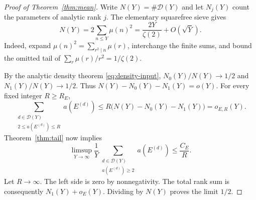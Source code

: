 \begin{proof}[Proof of Theorem~\ref{thm:mean}]
Write \(N(Y)=\#\mathcal D(Y)\) and let \(N_j(Y)\) count the parameters
of analytic rank \(j\).
The elementary squarefree sieve gives
\[
 N(Y)=2\sum_{n\le Y}\mu(n)^2
     =\frac{2Y}{\zeta(2)}+O(\sqrt Y).
\]
Indeed, expand \(\mu(n)^2=\sum_{r^2\mid n}\mu(r)\), interchange the
finite sums, and bound the omitted tail of
\(\sum_r\mu(r)/r^2=1/\zeta(2)\).

By the analytic density theorem \eqref{eq:density-input},
\(N_0(Y)/N(Y)\to1/2\) and \(N_1(Y)/N(Y)\to1/2\).
Thus \(N(Y)-N_0(Y)-N_1(Y)=o(Y)\).
For every fixed integer \(R\ge R_E\),
\[
 \sum_{\substack{d\in\mathcal D(Y)\\2\le a(E^{(d)})\le R}}
        a(E^{(d)})
 \le R\bigl(N(Y)-N_0(Y)-N_1(Y)\bigr)=o_{E,R}(Y).
\]
Theorem~\ref{thm:tail} now implies
\[
 \limsup_{Y\to\infty}\frac1Y
 \sum_{\substack{d\in\mathcal D(Y)\\a(E^{(d)})\ge2}}a(E^{(d)})
 \le\frac{C_E}{R}.
\]
Let \(R\to\infty\). The left side is zero by nonnegativity.
The total rank sum is consequently \(N_1(Y)+o_E(Y)\).
Dividing by \(N(Y)\) proves the limit \(1/2\).
\end{proof}
